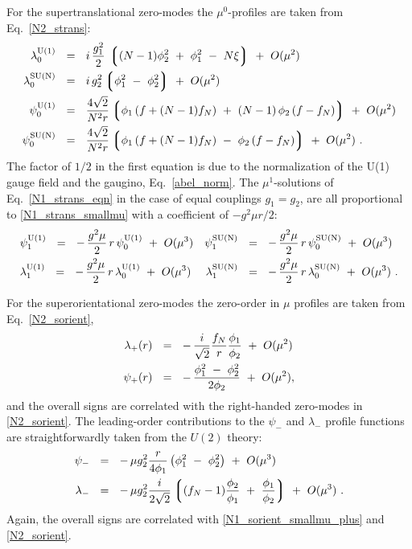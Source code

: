 \documentclass{article}
\newcommand{\lgr}{\left\lgroup}
\newcommand{\rgr}{\right\rgroup}
\begin{document}
	For the supertranslational zero-modes the $ \mu^0 $-profiles are taken from Eq.~\eqref{N2_strans}:
\begin{align}
%
\notag
	\loU & ~~=~~ i\, \frac{g_1^2}{2}\, \lgr (N-1) \phi_2^2 ~+~ \phi_1^2 ~-~ N\xi \rgr  ~+~ O(\mu^2) 
	\\
%
\notag
	\loN & ~~=~~ i\, g_2^2 \lgr \phi_1^2 ~-~ \phi_2^2 \rgr ~+~ O(\mu^2)
	\\
%
\label{N1_strans_smallmu}
	\poU & ~~=~~ \frac{4\sqrt{2}}{N^2 r} \lgr \phi_1\, (f + (N-1) f_N) ~+~ (N-1)\, \phi_2\, (f-f_N) \rgr ~+~ O(\mu^2)
	\\
%
\notag
	\poN & ~~=~~ \frac{4\sqrt{2}}{N^2 r} \lgr \phi_1\, (f + (N-1) f_N) ~-~ \phi_2\, (f-f_N) \rgr ~+~ O(\mu^2)
	~.
\end{align}
	The factor of $ 1/2 $ in the first equation is due to the normalization of the U(1) gauge field and the
gaugino, Eq.~\eqref{abel_norm}.
	The $\mu^1$-solutions of Eq.~\eqref{N1_strans_eqn} in the case of equal couplings $ g_1 = g_2 $, are all proportional
to \eqref{N1_strans_smallmu} with a coefficient of $ - g^2 \mu r / 2 $:
\begin{align*}
%
	& \plU ~~=~~ -\, \frac{g^2\mu}{2}\, r \, \poU ~+~ O(\mu^3)		& \plN &~~=~~ -\, \frac{g^2\mu}{2}\, r\, \poN ~+~ O(\mu^3)  
	\\
%
	& \llU ~~=~~ -\, \frac{g^2\mu}{2}\, r \, \loU ~+~ O(\mu^3)		& \llN &~~=~~ -\, \frac{g^2\mu}{2}\, r\, \loN ~+~ O(\mu^3)~.
\end{align*}

For the superorientational zero-modes the zero-order in $ \mu $ profiles are taken from Eq.~\eqref{N2_sorient},
\begin{align}
%
\notag
 	\lambda_+(r) & ~~=~~ -\, \frac{i}{\sqrt{2}} \frac{f_N}{r} \frac{\phi_1}{\phi_2}  ~+~ O(\mu^2) \\
%
\label{N1_sorient_smallmu_plus}
	\psi_+(r) & ~~=~~ -\, \frac{\phi_1^2 ~-~ \phi_2^2}{2\phi_2} ~+~ O(\mu^2),
\end{align}
and the overall signs are correlated with the right-handed zero-modes in \eqref{N2_sorient}.
The leading-order contributions to the $ \psi_- $ and $ \lambda_- $ profile functions are straightforwardly taken from the $ U(2) $ theory:
\begin{align*}
%
	\psi_- & ~~=~~ -\, \mu g_2^2 \frac{r}{4\phi_1} \left( \phi_1^2 ~-~ \phi_2^2 \right)  ~+~ O(\mu^3)
	\\ 
%
	\lambda_- & ~~=~~ -\, \mu g_2^2 \frac{i}{2\sqrt{2}} \lgr (f_N - 1) \frac{\phi_2}{\phi_1} ~+~ \frac{\phi_1}{\phi_2} \rgr ~+~ O(\mu^3)~.
\end{align*}
Again, the overall signs are correlated with \eqref{N1_sorient_smallmu_plus} and \eqref{N2_sorient}.
\end{document}
